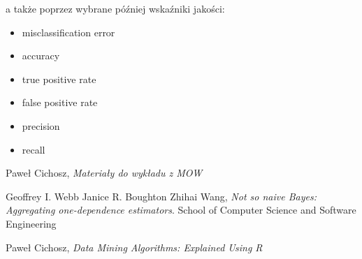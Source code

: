 \documentclass[16]{article}
\begin{document}
a także poprzez wybrane później wskaźniki jakości:
\begin{itemize}
	\item misclassification error
	\item accuracy
	\item true positive rate
  \item false positive rate
	\item precision
	\item recall
\end{itemize}

\begin{thebibliography}{9}
	
		Paweł Cichosz,
		\emph{Materiały do wykładu z MOW}
			
		Geoffrey I. Webb
		Janice R. Boughton
		Zhihai Wang,
		\emph{Not so naive Bayes: Aggregating one-dependence estimators}.
		School of Computer Science and Software Engineering
    
		Paweł Cichosz,
		\emph{Data Mining Algorithms: Explained Using R}
\end{thebibliography}
\end{document}
